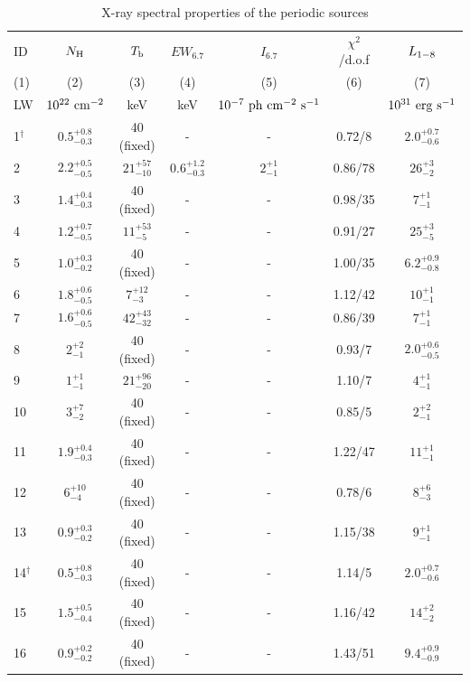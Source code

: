 \documentclass[fleqn,usenatbib]{mnras}
\begin{document}
\begin{table}
\centering
\begin{threeparttable}
\caption{X-ray spectral properties of the periodic sources \label{tab:spec}}
\begin{spacing}{1.19}

\begin{tabular}{lcccccc}
\hline
\hline
ID & $N_{\rm H}$ & $T_{\rm b}$ &  $EW_{6.7}$ &$I_{6.7}$ & $\chi^2$/d.o.f & $L_{\rm 1-8}$ 
\\
(1) & (2) & (3) & (4) & (5) & (6) & (7)
\\
LW & $10^{22}\rm~cm^{-2}$ & keV & keV & $\rm 10^{-7}~ph~ cm^{-2}~s^{-1} $ & & $10^{31}\rm~erg~s^{-1}$ 
\\
\hline

1$^\dag$ & $0.5^{+0.8}_{-0.3}$ & 40 (fixed)  & - & - & 0.72/8  & $2.0^{+0.7}_{-0.6}$
\\
2 & $2.2^{+0.5}_{-0.5}$ & $21^{+57}_{-10}$ & $0.6^{+1.2}_{-0.3}$ & $2^{+1}_{-1}$ & 0.86/78  & $26^{+3}_{-2}$
\\
3 & $1.4^{+0.4}_{-0.3}$ & 40 (fixed) & - & - & 0.98/35  & $7^{+1}_{-1}$
\\
4 & $1.2^{+0.7}_{-0.5}$ & $11^{+53}_{-5}$ & - & - & 0.91/27  & $25^{+3}_{-5}$
\\
5 & $1.0^{+0.3}_{-0.2}$ & 40 (fixed) & - & -& 1.00/35 &  $6.2^{+0.9}_{-0.8}$
\\
6 & $1.8^{+0.6}_{-0.5}$ & $7^{+12}_{-3}$ 
	& - & -& 1.12/42 &  $10^{+1}_{-1}$
\\
7 & $1.6^{+0.6}_{-0.5}$ & $42^{+43}_{-32}$ & - &- & 0.86/39 &  $7 ^{+1}_{-1}$
\\
8 & $2^{+2}_{-1}$ & 40 (fixed) & - &- & 0.93/7 &  $2.0^{+0.6}_{-0.5}$
\\
9 & $1^{+1}_{-1}$ & $21^{+96}_{-20}$ & -  &- & 1.10/7 &  $4^{+1}_{-1}$
\\
10 & $3^{+7}_{-2}$ & 40 (fixed)  & - &- & 0.85/5 &  $2^{+2}_{-1}$
\\
11 & $1.9^{+0.4}_{-0.3}$ & 40 (fixed)  & - &- & 1.22/47 &  $11^{+1}_{-1}$
\\
12 & $6^{+10}_{-4}$ & 40 (fixed) &-&-& 0.78/6 &  $8^{+6}_{-3}$
\\
13 & $0.9^{+0.3}_{-0.2}$ & 40 (fixed) & - &- & 1.15/38 &  $9^{+1}_{-1}$
\\
14$^\dag$ & $0.5^{+0.8}_{-0.3}$ & 40 (fixed) & - &- &  1.14/5 &  $2.0^{+0.7}_{-0.6}$
\\
15 & $1.5^{+0.5}_{-0.4}$ & 40 (fixed) & - &- &  1.16/42 & $14^{+2}_{-2}$
\\
16 & $0.9^{+0.2}_{-0.2}$ & 40 (fixed) & - &-&  1.43/51  & $9.4^{+0.9}_{-0.9}$

\end{tabular}
\end{spacing}
\end{threeparttable}
\end{table}
\end{document}
